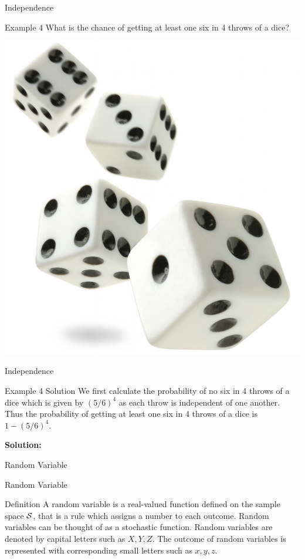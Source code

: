 \documentclass[aspectratio=169,xcolor=dvipsnames,svgnames,x11names,fleqn]{beamer}
\newcommand{\showanswers}{yes}
\begin{document}
    
    \begin{frame}[containsverbatim]{Independence}
    
        \begin{exampleblock}{Example 4}
        What is the chance of getting at least one six in 4 throws of a dice?
        \end{exampleblock}

        \begin{center}
            \includegraphics[width=0.15\linewidth]{figures/four_dice.jpg}
        \end{center}

    \end{frame}
    
    
    \begin{frame}[containsverbatim]{Independence}
        \ifthenelse{\equal{\showanswers}{yes}}
        {
    \begin{examplesolution}{Example 4 Solution}
        We first calculate the probability of no six in 4 throws of a dice which is given by $(5/6)^4$ as each throw is independent of one another. Thus the probability of getting at least one six in 4 throws of a dice is $1 - (5/6)^4$.
        \end{examplesolution}
        }
        {
            \textbf{Solution:} \color{LightGray}{Blank space for calculation}
        }
    \end{frame}

\begin{subsectionframe}{Random Variable}
\end{subsectionframe}

\begin{frame}[containsverbatim]{Random Variable}
    \begin{tblock}{Definition}
        A random variable is a real-valued function defined on the sample space ${\mathcal S}$, that is a rule which assigns a number to each outcome. Random variables can be thought of as a stochastic function. Random variables are denoted by capital letters such as $X, Y, Z$. The outcome of random variables is represented with corresponding small letters such as $x, y, z$.
    
    \end{tblock}

\end{frame}
\end{document}
